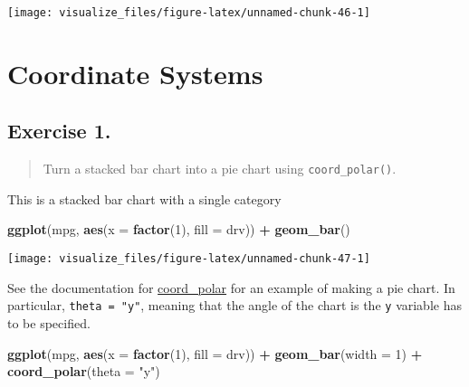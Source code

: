 \documentclass[]{book}
\newenvironment{Shaded}{\begin{snugshade}}{\end{snugshade}}
\newcommand{\DataTypeTok}[1]{\textcolor[rgb]{0.13,0.29,0.53}{#1}}
\newcommand{\DecValTok}[1]{\textcolor[rgb]{0.00,0.00,0.81}{#1}}
\newcommand{\KeywordTok}[1]{\textcolor[rgb]{0.13,0.29,0.53}{\textbf{#1}}}
\newcommand{\NormalTok}[1]{#1}
\newcommand{\OperatorTok}[1]{\textcolor[rgb]{0.81,0.36,0.00}{\textbf{#1}}}
\newcommand{\StringTok}[1]{\textcolor[rgb]{0.31,0.60,0.02}{#1}}
\theoremstyle{definition}
\theoremstyle{definition}
\theoremstyle{definition}
\theoremstyle{remark}
\begin{document}
\begin{center}\texttt{[image: visualize\_files/figure-latex/unnamed-chunk-46-1]} \end{center}

\hypertarget{coordinate-systems}{%
\section{Coordinate Systems}\label{coordinate-systems}}

\hypertarget{exercise-1.-6}{%
\subsection{Exercise 1.}\label{exercise-1.-6}}

\begin{quote}
Turn a stacked bar chart into a pie chart using \texttt{coord\_polar()}.
\end{quote}

This is a stacked bar chart with a single category

\begin{Shaded}
\begin{Highlighting}[]
\KeywordTok{ggplot}\NormalTok{(mpg, }\KeywordTok{aes}\NormalTok{(}\DataTypeTok{x =} \KeywordTok{factor}\NormalTok{(}\DecValTok{1}\NormalTok{), }\DataTypeTok{fill =}\NormalTok{ drv)) }\OperatorTok{+}
\StringTok{  }\KeywordTok{geom_bar}\NormalTok{()}
\end{Highlighting}
\end{Shaded}

\begin{center}\texttt{[image: visualize\_files/figure-latex/unnamed-chunk-47-1]} \end{center}

See the documentation for
\href{http://docs.ggplot2.org/current/coord_polar.html}{coord\_polar}
for an example of making a pie chart. In particular,
\texttt{theta\ =\ "y"}, meaning that the angle of the chart is the
\texttt{y} variable has to be specified.

\begin{Shaded}
\begin{Highlighting}[]
\KeywordTok{ggplot}\NormalTok{(mpg, }\KeywordTok{aes}\NormalTok{(}\DataTypeTok{x =} \KeywordTok{factor}\NormalTok{(}\DecValTok{1}\NormalTok{), }\DataTypeTok{fill =}\NormalTok{ drv)) }\OperatorTok{+}
\StringTok{  }\KeywordTok{geom_bar}\NormalTok{(}\DataTypeTok{width =} \DecValTok{1}\NormalTok{) }\OperatorTok{+}
\StringTok{  }\KeywordTok{coord_polar}\NormalTok{(}\DataTypeTok{theta =} \StringTok{"y"}\NormalTok{)}
\end{Highlighting}
\end{Shaded}
\end{document}
